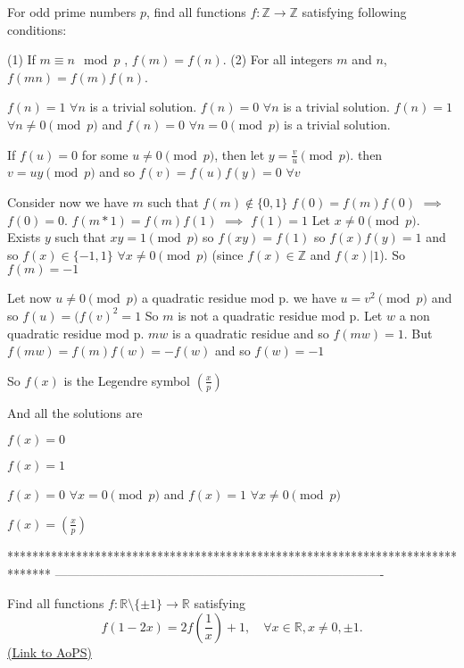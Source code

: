 \begin{solution}
	\begin{tcolorbox}For odd prime numbers $ p$, find all functions $ f: \mathbb{Z}\rightarrow\mathbb{Z}$ satisfying following conditions:

(1) If $ m\equiv n\mod p$ , $ f(m) = f(n)$.
(2) For all integers $ m$ and $ n$, $ f(mn) = f(m)f(n)$.\end{tcolorbox}

$ f(n) = 1$ $ \forall n$ is a trivial solution.
$ f(n) = 0$ $ \forall n$ is a trivial solution.
$ f(n) = 1$ $ \forall n\neq 0\pmod p$ and $ f(n)=0$ $ \forall n=0\pmod p$ is a trivial solution.

If $ f(u)=0$ for some $ u\neq 0\pmod p$, then let $ y=\frac{v}{u}\pmod p$. then $ v=uy\pmod p$ and so $ f(v)=f(u)f(y)=0$ $ \forall v$

Consider now we have $ m$ such that $ f(m)\notin\{0,1\}$ 
$ f(0) = f(m)f(0)$ $ \implies$ $ f(0) = 0$.
$ f(m*1) = f(m)f(1)$ $ \implies$ $ f(1) = 1$
Let $ x\neq 0\pmod p$. Exists $ y$ such that $ xy = 1\pmod p$ so $ f(xy) = f(1)$ so $ f(x)f(y) = 1$ and so $ f(x)\in\{ - 1,1\}$ $ \forall x\neq0\pmod p$ (since $ f(x)\in\mathbb Z$ and $ f(x)|1$). So $ f(m) = - 1$

Let now $ u\neq 0\pmod p$ a quadratic residue mod p. we have $ u = v^2\pmod p$ and so $ f(u) = (f(v)^2 = 1$
So $ m$ is not a quadratic residue mod p.
Let $ w$ a non quadratic residue mod p. $ mw$ is a quadratic residue and so $ f(mw) = 1$. But $ f(mw) = f(m)f(w) = - f(w)$ and so $ f(w) = - 1$

So $ f(x)$ is the Legendre symbol $ \left(\frac {x}{p}\right)$

And all the solutions are 

$ f(x) = 0$

$ f(x) = 1$

$ f(x) = 0$ $ \forall x=0\pmod p$ and $ f(x)=1$ $ \forall x\neq 0\pmod p$

$ f(x) = \left(\frac {x}{p}\right)$
\end{solution}
*******************************************************************************
-------------------------------------------------------------------------------

\begin{problem}
	Find all functions $f: \mathbb R \setminus \{\pm 1\} \to \mathbb R$ satisfying
\[ f(1-2x) = 2 f\left(\frac 1x \right) + 1, \quad \forall x \in \mathbb R, x \neq 0,\pm 1.\]
	\flushright \href{https://artofproblemsolving.com/community/c6h275982}{(Link to AoPS)}
\end{problem}



